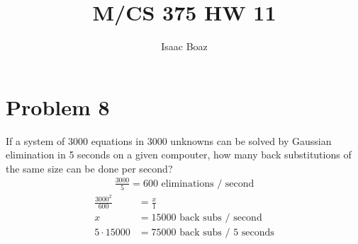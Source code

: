 \documentclass{article}
\title{\vspace{-5ex}M/CS 375 HW 11}
\author{Isaac Boaz}
\begin{document}
\maketitle

\section*{Problem 8}
If a system of 3000 equations in 3000 unknowns can be solved by Gaussian elimination in 5 seconds on a given compouter, how many back substitutions of the same size can be done per second?
\begin{align*}
    \frac{3000}{5} = 600 \text{ eliminations / second}
\end{align*}
\begin{align*}
    \frac{3000^2}{600} & = \frac{x}{1}                         \\
    x                  & = 15000 \text{ back subs / second}    \\
    5 \cdot 15000      & = 75000 \text{ back subs / 5 seconds} \\
\end{align*}
\end{document}
